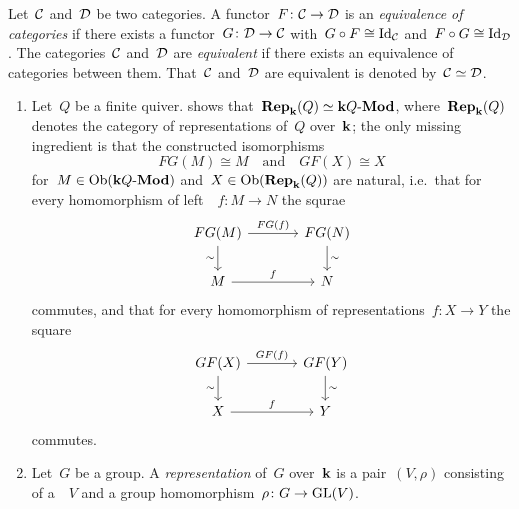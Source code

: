 \begin{definition}
  Let~$\mathcal{C}$ and~$\mathcal{D}$ be two categories.
  A functor~$F \colon \mathcal{C} \to \mathcal{D}$ is an \emph{equivalence of categories} if there exists a functor~$G \colon \mathcal{D} \to \mathcal{C}$ with~$G \circ F \cong \mathrm{Id}_{\mathcal{C}}$ and~$F \circ G \cong \mathrm{Id}_{\mathcal{D}}$.
  The categories~$\mathcal{C}$ and~$\mathcal{D}$ are \emph{equivalent} if there exists an equivalence of categories between them.
  That~$\mathcal{C}$ and~$\mathcal{D}$ are equivalent is denoted by~$\mathcal{C} \simeq \mathcal{D}$.
\end{definition}


\begin{example}
  \label{examples for equivalences}
  \leavevmode
  \begin{enumerate}
    \item
      \label{quiver reps are modules over path algebra}
      Let~$Q$ be a finite quiver.
       shows that~$\mathbf{Rep}_{\mathbf{k}}(Q) \simeq \text{$\mathbf{k} Q$-$\mathbf{Mod}$}$, where~$\mathbf{Rep}_{\mathbf{k}}(Q)$ denotes the category of representations of~$Q$ over~$\kf$;
      the only missing ingredient is that the constructed isomorphisms
      \[
              FG(M)
        \cong M
        \quad\text{and}\quad
              GF(X)
        \cong X
      \]
      for~$M \in \operatorname{Ob}(\text{$\mathbf{k} Q$-$\mathbf{Mod}$})$ and~$X \in \operatorname{Ob}(\mathbf{Rep}_{\mathbf{k}}(Q))$ are natural, i.e.\ that for every homomorphism of left~{}~$f \colon M \to N$ the squrae
      \[
        \begin{tikzcd}[column sep = large]
            FG(M)
            \arrow{r}[above]{FG(f)}
            \arrow{d}[left]{\sim}
          & FG(N)
            \arrow{d}[right]{\sim}
          \\
            M
            \arrow{r}[above]{f}
          & N
        \end{tikzcd}
      \]
      commutes, and that for every homomorphism of representations~$f \colon X \to Y$ the square
      \[
        \begin{tikzcd}[column sep = large]
            GF(X)
            \arrow{r}[above]{GF(f)}
            \arrow{d}[left]{\sim}
          & GF(Y)
            \arrow{d}[right]{\sim}
          \\
            X
            \arrow{r}[above]{f}
          & Y
        \end{tikzcd}
      \]
      commutes.
    \item
      Let~$G$ be a group.
      A \emph{representation} of~$G$ over~$\kf$ is a pair~$(V,\rho)$ consisting of a~{\module{$\kf$}}~$V$ and a group homomorphism~$\rho \colon G \to \operatorname{GL}(V)$.

\end{enumerate}
\end{example}
